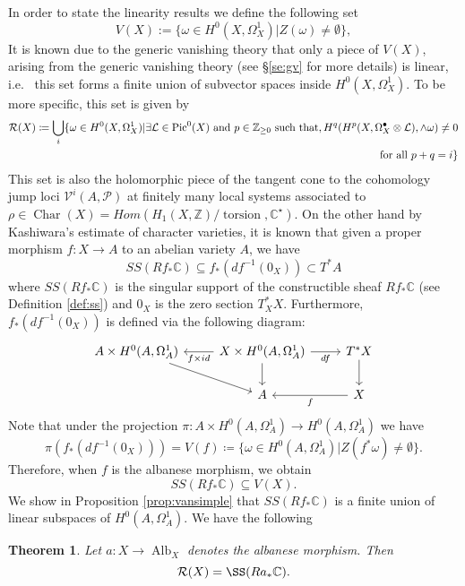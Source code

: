 \documentclass[11pt,reqno]{amsart}
\newtheorem{alphtheorem}{Theorem}
\theoremstyle{definition}
\theoremstyle{remark}
\theoremstyle{cited}
\theoremstyle{citeddef}
\DeclareMathOperator{\Alb}{Alb}
\DeclareMathOperator{\Char}{Char}
\def\Pic{{\rm Pic}}
\newcommand{\sL}{\mathcal{L}}
\newcommand{\sP}{\mathcal{P}}
\newcommand{\sR}{\mathcal{R}}
\newcommand\sV{{\mathcal V}}
\newcommand{\bbC}{\mathbb{C}}
\newcommand{\bbZ}{\mathbb{Z}}
\DeclareMathOperator{\torsion}{torsion}
\begin{document}
In order to state the linearity results we define
the following set
\[V(X):=\{ \omega\in H^0(X, \Omega_X^1) | Z(\omega)\neq \emptyset\},\]
It is known due to the generic vanishing theory
that only a piece of $V(X)$, arising from the generic vanishing theory (see \S \ref{se:gv} for more details) is linear, i.e.\
this set forms a finite union of subvector spaces inside $H^0(X, \Omega_X^1)$. To be more specific, this set is given by
\cite[p.\ 311]{Ara}
\begin{equation}
\begin{split}
\sR(X)\coloneqq \bigcup_i\{\omega\in H^0(X, \Omega_X^1)| \exists \sL\in \Pic^0(X) \text{ and } p\in \bbZ_{\geq 0} \text{ such that},
H^q(H^{p}(X, \Omega_X^{\bullet}\otimes \sL), \wedge\omega) \neq 0
\\\text{ for all } p+q=i\}
\label{eq:}
\end{split}
\end{equation}
This set is also the holomorphic piece of the tangent cone to the cohomology jump loci 
$\sV^i(A,\sP)$ at finitely many local systems associated to $\rho\in\Char(X) = Hom(H_1(X,\bbZ)/\torsion, \bbC^{\star})$.
On the other hand by Kashiwara's estimate
of character varieties, it is known that given a proper morphism
$f\colon X\to A$ to an abelian variety $A$, we have
\[SS(Rf_*\bbC) \subseteq f_*(df^{-1}(0_X))\subset T^*A\]
where $SS(Rf_*\bbC)$ is the singular support of the constructible
sheaf $Rf_*\bbC$ (see Definition \ref{def:ss}) and $0_X$ is the
zero section $T^*_XX$. Furthermore, $f_*(df^{-1}(0_X))$ is
defined via the following diagram:
\begin{equation}
\begin{tikzcd}
A\times H^0(A,\Omega_A^1)  \ar[dr]
& X\times H^0(A, \Omega_A^1)\ar[r, "df"']\ar[d] \ar[l, "f\times id"]
& T^*X \ar[d]\\
&A  & X\ar[l, "f"]
\end{tikzcd}
\label{eq:maindiagram}
\end{equation}
Note that under the projection $\pi\colon A\times H^0(A,\Omega_A^1)\to H^0(A,\Omega_A^1)$ we have
\[\pi(f_*(df^{-1}(0_X))) = V(f) \coloneqq \{\omega\in H^0(A,\Omega_A^1)|
Z(f^*\omega) \neq \emptyset\}.\]
Therefore, when $f$ is the albanese morphism, we obtain
\[SS(Rf_*\bbC)\subseteq V(X).\]
We show in Proposition \ref{prop:vansimple} 
that $SS(Rf_*\bbC)$ is a finite union of linear subspaces of $H^0(A,\Omega_A^1)$. We
have the following
\begin{alphtheorem}
Let $a\colon X\to \Alb_X$ denotes the albanese morphism. Then
\[\sR(X) =  \SS(Ra_*\bbC). \]
\label{thm:linearity}
\end{alphtheorem}
\end{document}
